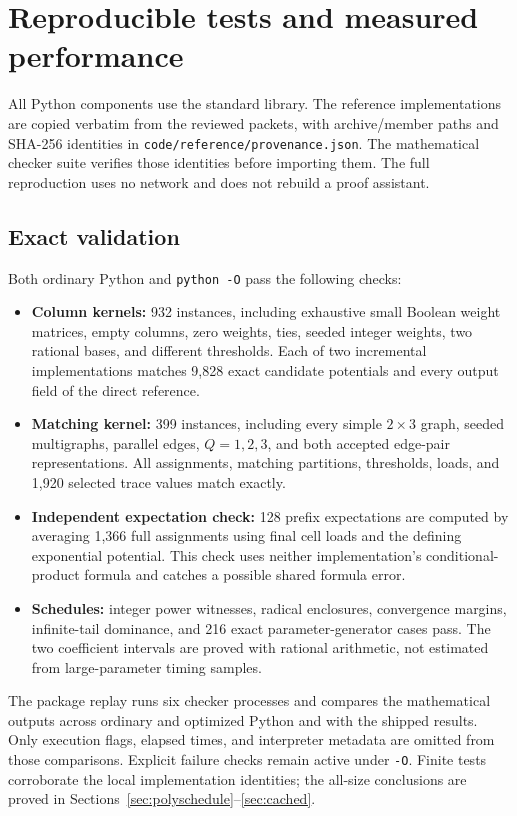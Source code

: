 \section{Reproducible tests and measured performance}\label{sec:experiments}
All Python components use the standard library. The reference implementations
are copied verbatim from the reviewed packets, with archive/member paths and
SHA-256 identities in \texttt{code/reference/provenance.json}. The mathematical
checker suite verifies those identities before importing them. The full
reproduction uses no network and does not rebuild a proof assistant.

\subsection{Exact validation}
Both ordinary Python and \texttt{python -O} pass the following checks:
\begin{itemize}
\item \textbf{Column kernels:} 932 instances, including exhaustive small
Boolean weight matrices, empty columns, zero weights, ties, seeded integer
weights, two rational bases, and different thresholds. Each of two incremental
implementations matches 9,828 exact candidate potentials and every output
field of the direct reference.
\item \textbf{Matching kernel:} 399 instances, including every simple
$2\times3$ graph, seeded multigraphs, parallel edges, $Q=1,2,3$, and both
accepted edge-pair representations. All assignments, matching partitions,
thresholds, loads, and 1,920 selected trace values match exactly.
\item \textbf{Independent expectation check:} 128 prefix expectations are
computed by averaging 1,366 full assignments using final cell loads and the
defining exponential potential. This check uses neither implementation's
conditional-product formula and catches a possible shared formula error.
\item \textbf{Schedules:} integer power witnesses, radical enclosures,
convergence margins, infinite-tail dominance, and 216 exact parameter-generator
cases pass. The two coefficient intervals are proved with rational arithmetic,
not estimated from large-parameter timing samples.
\end{itemize}
The package replay runs six checker processes and compares the mathematical
outputs across ordinary and optimized Python and with the shipped results.
Only execution flags, elapsed times, and interpreter metadata are omitted
from those comparisons. Explicit failure checks remain active under
\texttt{-O}. Finite tests corroborate the local implementation identities;
the all-size conclusions are proved in Sections~\ref{sec:polyschedule}--\ref{sec:cached}.

